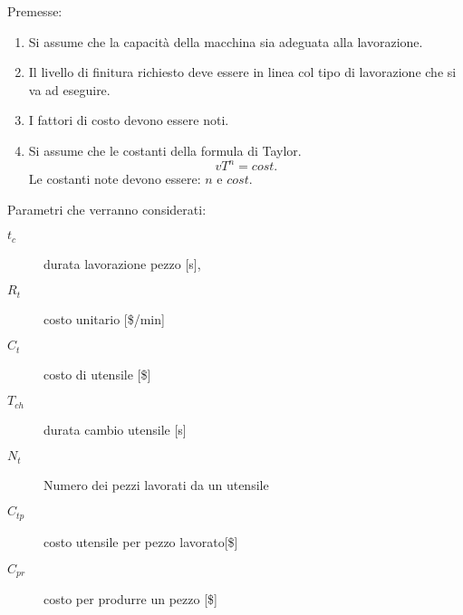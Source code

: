 Premesse:
\begin{enumerate}
\item Si assume che la capacità della macchina sia adeguata alla lavorazione.
\item Il livello di finitura richiesto deve essere in linea col tipo di lavorazione che si va ad eseguire.
\item I fattori di costo devono essere noti.
\item Si assume che le costanti della formula di Taylor.
\begin{equation}
vT^n = cost.
\end{equation}
Le costanti note devono essere: $n$ e $cost.$
\end{enumerate}
Parametri che verranno considerati:
\begin{description}
\item[$t_c$] durata lavorazione pezzo [s],
\item[$R_t$] costo unitario [\$/min]
\item[$C_t$] costo di utensile [\$]
\item[$T_{ch}$] durata cambio utensile [s]
\item[$N_t$] Numero dei pezzi lavorati da un utensile
\item[$C_{tp}$] costo utensile per pezzo lavorato[\$]
\item[$C_{pr}$] costo per produrre un pezzo [\$]
\end{description}

